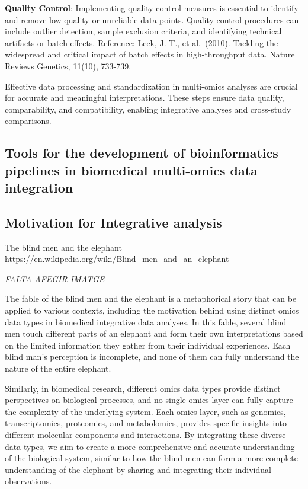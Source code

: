\documentclass[a4paper, nobind]{templates/ociamthesis}
\begin{document}
\textbf{Quality Control}: Implementing quality control measures is essential to identify and remove low-quality or unreliable data points. Quality control procedures can include outlier detection, sample exclusion criteria, and identifying technical artifacts or batch effects. Reference: Leek, J. T., et al.~(2010). Tackling the widespread and critical impact of batch effects in high-throughput data. Nature Reviews Genetics, 11(10), 733-739.

Effective data processing and standardization in multi-omics analyses are crucial for accurate and meaningful interpretations. These steps ensure data quality, comparability, and compatibility, enabling integrative analyses and cross-study comparisons.

\hypertarget{tools-for-the-development-of-bioinformatics-pipelines-in-biomedical-multi-omics-data-integration}{%
\subsection{Tools for the development of bioinformatics pipelines in biomedical multi-omics data integration}\label{tools-for-the-development-of-bioinformatics-pipelines-in-biomedical-multi-omics-data-integration}}

\hypertarget{motivation-for-integrative-analysis}{%
\subsection{Motivation for Integrative analysis}\label{motivation-for-integrative-analysis}}

The blind men and the elephant \url{https://en.wikipedia.org/wiki/Blind_men_and_an_elephant}

\emph{FALTA AFEGIR IMATGE}

The fable of the blind men and the elephant is a metaphorical story that can be applied to various contexts, including the motivation behind using distinct omics data types in biomedical integrative data analyses. In this fable, several blind men touch different parts of an elephant and form their own interpretations based on the limited information they gather from their individual experiences. Each blind man's perception is incomplete, and none of them can fully understand the nature of the entire elephant.

Similarly, in biomedical research, different omics data types provide distinct perspectives on biological processes, and no single omics layer can fully capture the complexity of the underlying system. Each omics layer, such as genomics, transcriptomics, proteomics, and metabolomics, provides specific insights into different molecular components and interactions. By integrating these diverse data types, we aim to create a more comprehensive and accurate understanding of the biological system, similar to how the blind men can form a more complete understanding of the elephant by sharing and integrating their individual observations.
\end{document}
